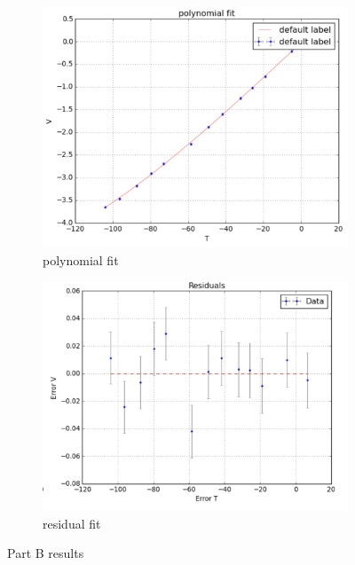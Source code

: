 \documentclass[12pt,a4paper]{article}
\begin{document}
\begin{figure}[htbp]
    \centering
    \begin{subfigure}[b]{0.48\textwidth}
      \includegraphics[width=\textwidth]{Part B results/polynomial-fit.png}
      \caption{polynomial fit}
      \label{fig:partB1}
    \end{subfigure}
    \hfill
    \begin{subfigure}[b]{0.48\textwidth}
      \includegraphics[width=\textwidth]{Part B results/polynomial residual.png}
      \caption{residual fit}
      \label{fig:partB2}
    \end{subfigure}
    \caption{Part B results}
    \label{fig:partB_results}
  \end{figure}
  
\end{document}
